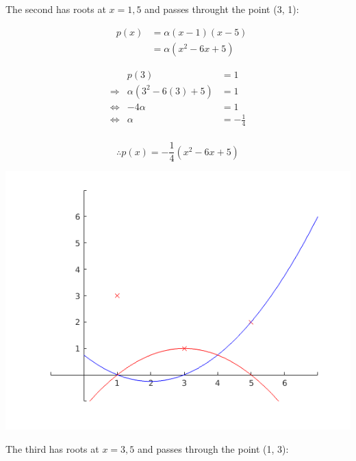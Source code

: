\documentclass[MathsNotesBase.tex]{subfiles}
\begin{document}
{	
	\begin{par}
	\begin{flushleft}
	The second has roots at $x=1,5$ and passes throught the point (3, 1):
	\end{flushleft}
	\end{par}
	
	\begin{par}
	$$\begin{array}{lcr}
	&p(x) &= \alpha(x-1)(x-5)\\
	&&= \alpha(x^2-6x+5)
	\end{array}$$
	\end{par}
	
	\begin{par}
	$$\begin{array}{lcr}
	&p(3)&=1 \\
	\Longrightarrow &\alpha(3^2-6(3) + 5) &= 1 \\
	\iff &-4\alpha&=1\\
	\iff &\alpha &= -\frac{1}{4}\\
	\end{array}$$
	\end{par}
	
	\begin{par}
	$$\therefore p(x) = -\frac{1}{4}(x^2-6x+5)$$
	\end{par}
	
	
	\begin{center}
	\includegraphics[width=\linewidth]{figure_2.png}
	\end{center}
	
	
	\begin{par}
	\begin{flushleft}
	The third has roots at $x=3,5$ and passes through the point (1, 3):
	\end{flushleft}
	\end{par}
	
}
\end{document}
